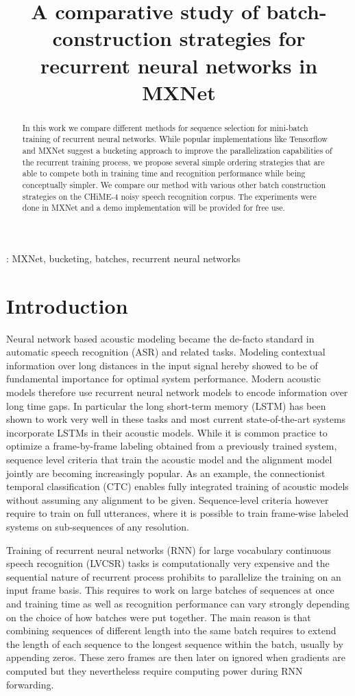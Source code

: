 \documentclass{article}
\title{A comparative study of batch-construction strategies for recurrent neural networks in MXNet}
\begin{document}
  \maketitle
  \begin{abstract}
  	 In this work we compare different methods for sequence selection for mini-batch training
  	 of recurrent neural networks. While popular implementations like Tensorflow and MXNet suggest 
  	 a bucketing approach to improve the parallelization capabilities of the recurrent training process, 
  	 we propose several simple ordering strategies that are able to compete both in training time and 
  	 recognition performance while being conceptually simpler. We compare our method with various other
  	 batch construction strategies on the CHiME-4 noisy speech recognition corpus. The experiments were
  	 done in MXNet and a demo implementation will be provided for free use.
  \end{abstract}
  : MXNet, bucketing, batches, recurrent neural networks

  \section{Introduction}
  	Neural network based acoustic modeling became the de-facto standard in automatic speech recognition (ASR)
  	and related tasks. Modeling contextual information over long distances in the input signal hereby showed to 
  	be of fundamental importance for optimal system performance. Modern acoustic models therefore use recurrent 
  	neural network models to encode information over long time gaps. In particular the long short-term memory (LSTM)
  	has been shown to work very well in these tasks and most current state-of-the-art systems incorporate LSTMs
  	in their acoustic models. While it is common practice to optimize a frame-by-frame labeling obtained from a 
  	previously trained system, sequence level criteria that train the acoustic model and the alignment model jointly
  	are becoming increasingly popular. As an example, the connectionist temporal classification (CTC) \cite{CTC}
  	enables fully integrated training of acoustic models without assuming any alignment to be given. Sequence-level
  	criteria however require to train on full utterances, where it is possible to train frame-wise labeled systems
  	on sub-sequences of any resolution.
  	
    Training of recurrent neural networks (RNN) for large vocabulary continuous speech recognition (LVCSR)
    tasks is computationally very expensive and the sequential nature of recurrent process prohibits to
    parallelize the training on an input frame basis. This requires to work on large batches of sequences
    at once and training time as well as recognition performance can vary strongly depending on the choice of how
    batches were put together. The main reason is that combining sequences of different length into the same batch requires 
    to extend the length of each sequence to the longest sequence within the batch, usually by appending zeros. These zero frames 
    are then later on ignored when gradients are computed but they nevertheless require computing power during RNN
    forwarding.
    
\end{document}
